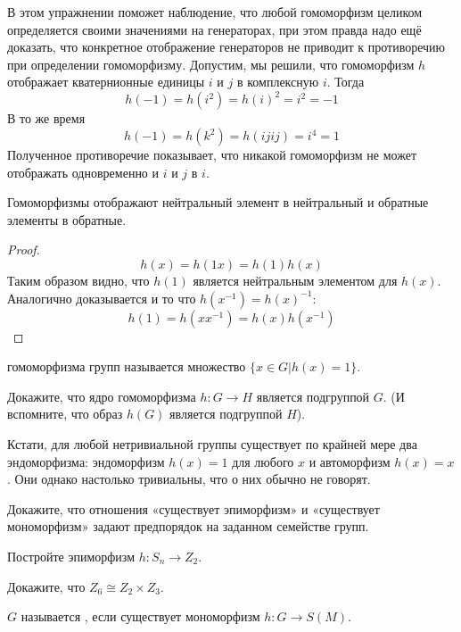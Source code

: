 В этом упражнении поможет наблюдение, что любой гомоморфизм целиком определяется своими значениями на генераторах, при этом правда надо ещё доказать, что конкретное отображение генераторов не приводит к противоречию при определении гомоморфизму. Допустим, мы решили, что гомоморфизм $h$ отображает кватернионные единицы $i$ и $j$ в комплексную $i$. Тогда
\[
h(-1) = h(i^2) = h(i)^2 = i^2 = -1
\]
В то же время
\[
h(-1) = h(k^2) = h(ijij) = i^4 = 1
\]
Полученное противоречие показывает, что никакой гомоморфизм не может отображать одновременно и $i$ и $j$ в $i$.

\begin{thm}
	Гомоморфизмы отображают нейтральный элемент в нейтральный и обратные элементы в обратные.
\end{thm}
\begin{proof}
	\[
	h(x) = h(1x) = h(1)h(x)
	\]
	Таким образом видно, что $h(1)$ является нейтральным элементом для $h(x)$. Аналогично доказывается и то что $h(x^{-1})=h(x)^{-1}$:
	\[
	h(1) = h(xx^{-1}) = h(x)h(x^{-1})
	\]
\end{proof}

\begin{definition}
	 гомоморфизма групп называется множество $\{x\in G|h(x) = 1\}$.
\end{definition}

\begin{exercise}
	Докажите, что ядро гомоморфизма ${h:G\to H}$ является подгруппой $G$. (И вспомните, что образ $h(G)$ является подгруппой $H$).
\end{exercise}

Кстати, для любой нетривиальной группы существует по крайней мере два эндоморфизма: эндоморфизм $h(x)=1$ для любого $x$ и автоморфизм $h(x)=x$. Они однако настолько тривиальны, что о них обычно не говорят.

\begin{exercise}
	Докажите, что отношения «существует эпиморфизм» и «существует мономорфизм» задают предпорядок на заданном семействе групп.
\end{exercise}

\begin{exercise}
	Постройте эпиморфизм $h:S_n\to Z_2$.
\end{exercise}

\begin{exercise}
	Докажите, что $Z_6\cong Z_2\times Z_3$.
\end{exercise}

\begin{definition}
	$G$ называется , если существует мономорфизм $h:G\to S(M)$.
\end{definition}

